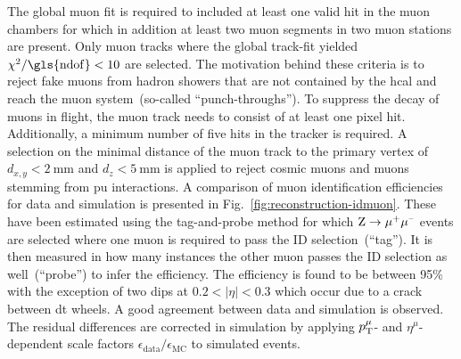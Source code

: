 The global muon fit is required to included at least one valid hit in the muon chambers for which in addition at least two muon segments in two muon stations are present. Only muon tracks where the global track-fit yielded $\chi^2/\mathrm{\gls{ndof}}<10$ are selected. The motivation behind these criteria is to reject fake muons from hadron showers that are not contained by the \gls{hcal} and reach the muon system~(so-called ``punch-throughs''). To suppress the decay of muons in flight, the muon track needs to consist of at least one pixel hit. Additionally, a minimum number of five hits in the tracker is required. A selection on the minimal distance of the muon track to the primary vertex of $d_{x,y}<2~\mathrm{mm}$ and $d_{z}<5~\mathrm{mm}$ is applied to reject cosmic muons and muons stemming from \gls{pu} interactions. A comparison of muon identification efficiencies for data and simulation is presented in Fig.~\ref{fig:reconstruction-idmuon}. These have been estimated using the tag-and-probe method for which $\mathrm{Z}\to\mu^{\rmplus}\mu^{\rmminus}$ events are selected where one muon is required to pass the ID selection~(``tag''). It is then measured in how many instances the other muon passes the ID selection as well~(``probe'') to infer the efficiency. The efficiency is found to be between 95\% with the exception of two dips at $0.2<|\eta|<0.3$ which occur due to a crack between \gls{dt} wheels. A good agreement between data and simulation is observed. The residual differences are corrected in simulation by applying $p_\mathrm{T}^{\mu}$- and $\eta^{\mu}$-dependent scale factors $\epsilon_\mathrm{data}/\epsilon_\mathrm{MC}$ to simulated events.

